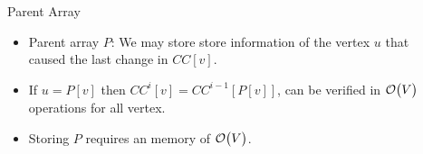 \lyxframeend{}

\begin{columns}
\begin{column}{0.5\textwidth}
\end{column}

\begin{column}{0.5\textwidth}
\begin{exampleblock}{Parent Array}
\begin{itemize}
\item Parent array $P$: We may store store information of the vertex $u$ that caused the last change in $CC[v]$.
\item If $u= P[v]$ then $CC^{i}[v] = CC^{i-1}[P[v]]$, can be verified in $\operatorname{\mathcal{O}}\bigl({V}\bigr)$ operations for all vertex.
\item Storing $P$ requires an memory of $\operatorname{\mathcal{O}}\bigl({V}\bigr)$.
 \end{itemize}
\end{exampleblock}


\end{column}
\end{columns}
